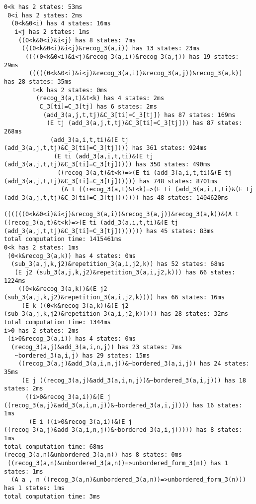 \begin{lstlisting}[basicstyle=\scriptsize\ttfamily]
0<k has 2 states: 53ms
 0<i has 2 states: 2ms
  (0<k&0<i) has 4 states: 16ms
   i<j has 2 states: 1ms
    ((0<k&0<i)&i<j) has 8 states: 7ms
     (((0<k&0<i)&i<j)&recog_3(a,i)) has 13 states: 23ms
      ((((0<k&0<i)&i<j)&recog_3(a,i))&recog_3(a,j)) has 19 states: 29ms
       (((((0<k&0<i)&i<j)&recog_3(a,i))&recog_3(a,j))&recog_3(a,k)) has 28 states: 35ms
        t<k has 2 states: 0ms
         (recog_3(a,t)&t<k) has 4 states: 2ms
          C_3[ti]=C_3[tj] has 6 states: 2ms
           (add_3(a,j,t,tj)&C_3[ti]=C_3[tj]) has 87 states: 169ms
            (E tj (add_3(a,j,t,tj)&C_3[ti]=C_3[tj])) has 87 states: 268ms
             (add_3(a,i,t,ti)&(E tj (add_3(a,j,t,tj)&C_3[ti]=C_3[tj]))) has 361 states: 924ms
              (E ti (add_3(a,i,t,ti)&(E tj (add_3(a,j,t,tj)&C_3[ti]=C_3[tj])))) has 350 states: 490ms
               ((recog_3(a,t)&t<k)=>(E ti (add_3(a,i,t,ti)&(E tj (add_3(a,j,t,tj)&C_3[ti]=C_3[tj]))))) has 748 states: 8701ms
                (A t ((recog_3(a,t)&t<k)=>(E ti (add_3(a,i,t,ti)&(E tj (add_3(a,j,t,tj)&C_3[ti]=C_3[tj])))))) has 48 states: 1404620ms
                 ((((((0<k&0<i)&i<j)&recog_3(a,i))&recog_3(a,j))&recog_3(a,k))&(A t ((recog_3(a,t)&t<k)=>(E ti (add_3(a,i,t,ti)&(E tj (add_3(a,j,t,tj)&C_3[ti]=C_3[tj]))))))) has 45 states: 83ms
total computation time: 1415461ms
0<k has 2 states: 1ms
 (0<k&recog_3(a,k)) has 4 states: 0ms
  (sub_3(a,j,k,j2)&repetition_3(a,i,j2,k)) has 52 states: 68ms
   (E j2 (sub_3(a,j,k,j2)&repetition_3(a,i,j2,k))) has 66 states: 1224ms
    ((0<k&recog_3(a,k))&(E j2 (sub_3(a,j,k,j2)&repetition_3(a,i,j2,k)))) has 66 states: 16ms
     (E k ((0<k&recog_3(a,k))&(E j2 (sub_3(a,j,k,j2)&repetition_3(a,i,j2,k))))) has 28 states: 32ms
total computation time: 1344ms
i>0 has 2 states: 2ms
 (i>0&recog_3(a,i)) has 4 states: 0ms
  (recog_3(a,j)&add_3(a,i,n,j)) has 23 states: 7ms
   ~bordered_3(a,i,j) has 29 states: 15ms
    ((recog_3(a,j)&add_3(a,i,n,j))&~bordered_3(a,i,j)) has 24 states: 35ms
     (E j ((recog_3(a,j)&add_3(a,i,n,j))&~bordered_3(a,i,j))) has 18 states: 2ms
      ((i>0&recog_3(a,i))&(E j ((recog_3(a,j)&add_3(a,i,n,j))&~bordered_3(a,i,j)))) has 16 states: 1ms
       (E i ((i>0&recog_3(a,i))&(E j ((recog_3(a,j)&add_3(a,i,n,j))&~bordered_3(a,i,j))))) has 8 states: 1ms
total computation time: 68ms
(recog_3(a,n)&unbordered_3(a,n)) has 8 states: 0ms
 ((recog_3(a,n)&unbordered_3(a,n))=>unbordered_form_3(n)) has 1 states: 1ms
  (A a , n ((recog_3(a,n)&unbordered_3(a,n))=>unbordered_form_3(n))) has 1 states: 1ms
total computation time: 3ms
\end{lstlisting}

